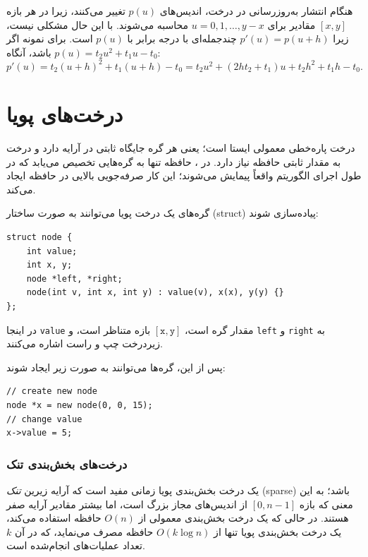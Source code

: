هنگام انتشار به‌روزرسانی در درخت، اندیس‌های $p(u)$ تغییر می‌کنند، زیرا در هر بازه $[x,y]$ مقادیر برای $u=0,1,\ldots,y-x$ محاسبه می‌شوند.
با این حال مشکلی نیست، زیرا $p'(u)=p(u+h)$ چندجمله‌ای با درجه برابر با $p(u)$ است.
برای نمونه اگر $p(u)=t_2 u^2+t_1 u-t_0$ باشد، آنگاه:
\[p'(u)=t_2(u+h)^2+t_1(u+h)-t_0=t_2 u^2 + (2ht_2+t_1)u+t_2h^2+t_1h-t_0.\]

\section{درخت‌های پویا}


درخت پاره‌خطی معمولی ایستا است؛ یعنی هر گره جایگاه ثابتی در آرایه دارد و درخت به مقدار ثابتی حافظه نیاز دارد.
در ، حافظه تنها به گره‌هایی تخصیص می‌یابد که در طول اجرای الگوریتم واقعاً پیمایش می‌شوند؛ این کار صرفه‌جویی بالایی در حافظه ایجاد می‌کند.

گره‌های یک درخت پویا می‌توانند به صورت ساختار (struct) پیاده‌سازی شوند:
\begin{lstlisting}
struct node {
    int value;
    int x, y;
    node *left, *right;
    node(int v, int x, int y) : value(v), x(x), y(y) {}
};
\end{lstlisting}
در اینجا \texttt{value} مقدار گره است،
$[\texttt{x},\texttt{y}]$ بازه متناظر است،
و \texttt{left} و \texttt{right} به زیردرخت چپ
و راست اشاره می‌کنند.

پس از این، گره‌ها می‌توانند به صورت زیر ایجاد شوند:
\begin{lstlisting}
// create new node
node *x = new node(0, 0, 15);
// change value
x->value = 5;
\end{lstlisting}

\subsubsection{درخت‌های بخش‌بندی تنک}


یک درخت بخش‌بندی پویا زمانی مفید است که
آرایه زیرین \emph{تنک} (sparse) باشد؛
به این معنی که بازه $[0,n-1]$ از اندیس‌های مجاز بزرگ است،
اما بیشتر مقادیر آرایه صفر هستند.
در حالی که یک درخت بخش‌بندی معمولی از $O(n)$ حافظه استفاده می‌کند،
یک درخت بخش‌بندی پویا تنها از $O(k \log n)$ حافظه مصرف می‌نماید،
که در آن $k$ تعداد عملیات‌های انجام‌شده است.

